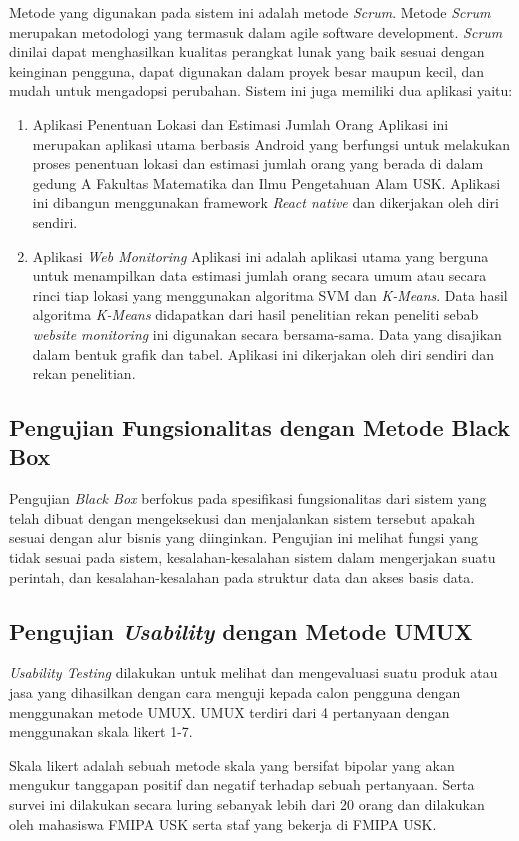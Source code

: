 Metode yang digunakan pada sistem ini adalah metode \textit{Scrum}. Metode \textit{Scrum} merupakan metodologi yang termasuk dalam agile software development. \textit{Scrum} dinilai dapat menghasilkan kualitas perangkat lunak yang baik sesuai dengan keinginan pengguna, dapat digunakan dalam proyek besar maupun kecil, dan mudah untuk mengadopsi perubahan. Sistem ini juga memiliki dua aplikasi yaitu:
\begin{enumerate}
	\item Aplikasi Penentuan Lokasi dan Estimasi Jumlah Orang
	      \newline Aplikasi ini merupakan aplikasi utama berbasis Android yang berfungsi untuk melakukan proses penentuan lokasi dan estimasi jumlah orang yang berada di dalam gedung A Fakultas Matematika dan Ilmu Pengetahuan Alam USK. Aplikasi ini dibangun menggunakan framework \textit{React native} dan dikerjakan oleh diri sendiri.

	\item Aplikasi \textit{Web Monitoring}
	      \newline Aplikasi ini adalah aplikasi utama yang berguna untuk menampilkan data estimasi jumlah orang secara umum atau secara rinci tiap lokasi yang menggunakan algoritma SVM dan \textit{K-Means}. Data hasil algoritma \textit{K-Means} didapatkan dari hasil penelitian rekan peneliti sebab \textit{website monitoring} ini digunakan secara bersama-sama. Data yang disajikan dalam bentuk grafik dan tabel. Aplikasi ini dikerjakan oleh diri sendiri dan rekan penelitian.


\end{enumerate}
\subsection{Pengujian Fungsionalitas dengan Metode Black Box}
\par Pengujian \textit{Black Box} berfokus pada spesifikasi fungsionalitas dari sistem yang telah dibuat dengan mengeksekusi dan menjalankan sistem tersebut apakah sesuai dengan alur bisnis yang diinginkan. Pengujian ini melihat fungsi yang tidak sesuai pada sistem, kesalahan-kesalahan sistem dalam mengerjakan suatu perintah, dan kesalahan-kesalahan pada struktur data dan akses basis data.

\subsection{Pengujian \textit{Usability} dengan Metode UMUX}
\par \textit{Usability Testing} dilakukan untuk melihat dan mengevaluasi suatu produk atau jasa yang dihasilkan dengan cara menguji kepada calon pengguna dengan menggunakan metode UMUX. UMUX terdiri dari 4 pertanyaan dengan menggunakan skala likert 1-7.
\par Skala likert adalah sebuah metode skala yang bersifat bipolar yang akan mengukur tanggapan positif dan negatif terhadap sebuah pertanyaan. Serta survei ini dilakukan secara luring sebanyak lebih dari 20 orang dan dilakukan oleh mahasiswa FMIPA USK serta staf yang bekerja di FMIPA USK.


